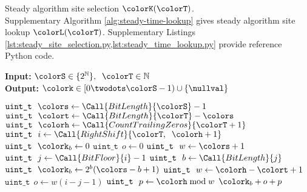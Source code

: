 \begin{algorithm}[H]
\caption{Steady algorithm site selection $\colorK(\colorT)$.\\ \footnotesize Supplementary Algorithm \ref{alg:steady-time-lookup} gives steady algorithm site lookup $\colorL(\colorT)$. Supplementary Listings \cref{lst:steady_site_selection.py,lst:steady_time_lookup.py} provide reference Python code.}
\label{alg:steady-site-selection}
\begin{minipage}{0.5\textwidth}
    \hspace*{\algorithmicindent} \textbf{Input:} $\colorS \in \{2^{\mathbb{N}}\},\;\; \colorT \in \mathbb{N}$ \\
    \hspace*{\algorithmicindent} \textbf{Output:} $\colork \in [0 \twodots \colorS - 1) \cup \{\nullval\}$ 
    \begin{algorithmic}[1]
        \State $\texttt{uint\_t} ~ ~ \colors \gets \Call{BitLength}{\colorS} - 1$
        \State $\texttt{uint\_t} ~ ~ \colort \gets \Call{BitLength}{\colorT} - \colors $ 
        \State $\texttt{uint\_t} ~ ~ \colorh \gets \Call{CountTrailingZeros}{\colorT + 1}$ 
         
        \State \Return \nullval {}
        \EndIf
        \State $\texttt{uint\_t} ~ ~ i \gets \Call{RightShift}{\colorT, \;\; \colorh + 1}$ 
         
        \State $\texttt{uint\_t} ~ ~ \colork_b \gets 0$ 
        \State $\texttt{uint\_t} ~ ~ o \gets 0$ 
        \State $\texttt{uint\_t} ~ ~ w \gets \colors + 1$ 
        \Else
        \State $\texttt{uint\_t} ~ ~ j \gets \Call{BitFloor}{i} - 1$ 
        \State $\texttt{uint\_t} ~ ~ b \gets \Call{BitLength}{j}$ 
        \State $\texttt{uint\_t} ~ ~ \colork_b \gets 2^{b}(\colors - b + 1)$ 
        \State $\texttt{uint\_t} ~ ~ w \gets \colorh - \colort + 1$ 
        \State $\texttt{uint\_t} ~ ~ o \gets w (i - j - 1)$ 
        \EndIf
        \State $\texttt{uint\_t} ~ ~ p \gets \colorh \bmod w$ 
        \State \Return $\colork_b + o + p$ 
    \end{algorithmic}
\end{minipage}
\end{algorithm}
